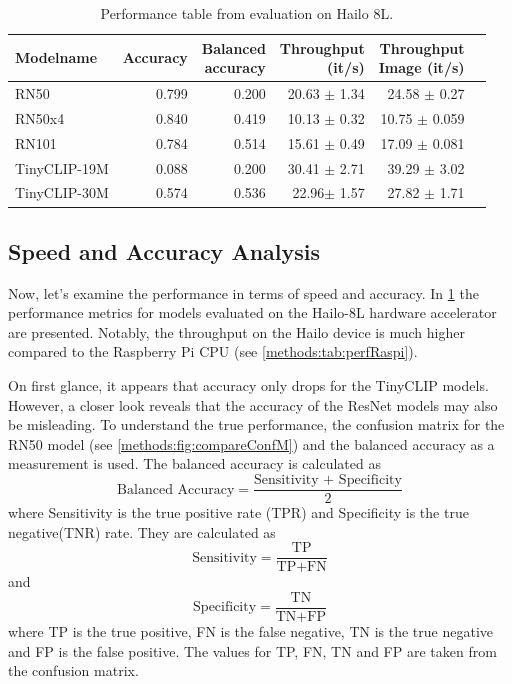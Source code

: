 \begin{table}[]
    \centering
    \begin{tabular}{l|rrrrr}
    \hline
    Modelname & Accuracy &  \makecell{Balanced \\accuracy}&\makecell{Throughput\\(it/s)} & \makecell{Throughput \\ Image (it/s)} & \\ \hline
    RN50 & 0.799 & 0.200 & 20.63 $\pm$ 1.34 & 24.58 $\pm$ 0.27  \\ 
    RN50x4 & 0.840 & 0.419 & 10.13 $\pm$ 0.32 & 10.75  $\pm$ 0.059\\
    RN101 & 0.784& 0.514 & 15.61 $\pm$ 0.49 & 17.09 $\pm$ 0.081\\  
    TinyCLIP-19M & 0.088 & 0.200 & 30.41 $\pm$ 2.71 & 39.29 $\pm$ 3.02 \\ 
    TinyCLIP-30M & 0.574 & 0.536 & 22.96$\pm$ 1.57 & 27.82 $\pm$ 1.71\\ 
    \end{tabular}
    \caption{Performance table from evaluation on Hailo 8L.}
    \label{methods:tab:perfHailo}
\end{table}

\subsection{Speed and Accuracy Analysis}

Now, let's examine the performance in terms of speed and accuracy.
In \cref{methods:tab:perfHailo} the performance metrics for models evaluated on the Hailo-8L hardware accelerator are presented.
Notably, the throughput on the Hailo device is much higher compared to the Raspberry Pi CPU (see \cref{methods:tab:perfRaspi}).

On first glance, it appears that accuracy only drops for the TinyCLIP models.
However, a closer look reveals that the accuracy of the ResNet models may also be misleading.
To understand the true performance, the confusion matrix for the RN50 model (see \cref{methods:fig:compareConfM}) and the balanced accuracy as a measurement is used.
The balanced accuracy is calculated as
\begin{equation*}
    \text{Balanced Accuracy} = \frac{\text{Sensitivity + Specificity}}{2}
\end{equation*}
where Sensitivity is the true positive rate (TPR) and Specificity is the true negative(TNR) rate.
They are calculated as
\begin{equation*}
    \text{Sensitivity} = \frac{\text{TP}}{\text{TP} + \text{FN}}
\end{equation*}
and 
\begin{equation*}
    \text{Specificity} = \frac{\text{TN}}{\text{TN} + \text{FP}}
\end{equation*}
where TP is the true positive, FN is the false negative, TN is the true negative and FP is the false positive.
The values for TP, FN, TN and FP are taken from the confusion matrix.


